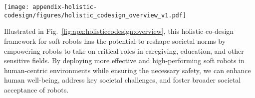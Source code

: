 \begin{figure*}[ht]
    \centering
    \texttt{[image: appendix-holistic-codesign/figures/holistic\_codesign\_overview\_v1.pdf]}
    \caption{Co-design process for soft robotics, integrating task requirements and objectives, intelligent materials, embedded actuation, autonomy stack (e.g., control and perception systems), environmental considerations, and human-robot interaction to optimize both performance and safety for human-centric robotic applications.}
    \label{fig:apx:holisticcodesign:overview}
\end{figure*}

Illustrated in Fig.~\ref{fig:apx:holisticcodesign:overview}, this holistic co-design framework for soft robots has the potential to reshape societal norms by empowering robots to take on critical roles in caregiving, education, and other sensitive fields. By deploying more effective and high-performing soft robots in human-centric environments while ensuring the necessary safety, we can enhance human well-being, address key societal challenges, and foster broader societal acceptance of robots.